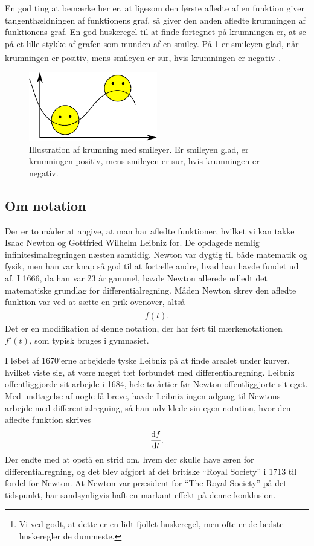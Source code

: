 En god ting at bemærke her er, at ligesom den første afledte af en funktion giver tangenthældningen af funktionens graf, så giver den anden afledte krumningen af funktionens graf.
En god huskeregel til at finde fortegnet på krumningen er, at se på et lille stykke af grafen som munden af en smiley. På \cref{mat:fig:krumning} er smileyen glad, når krumningen er positiv, mens smileyen er sur, hvis krumningen er negativ\footnote{Vi ved godt, at dette er en lidt fjollet huskeregel, men ofte er de bedste huskeregler de dummeste.}.
%
\begin{figure}[]
    \centering
    \includegraphics[width = 0.5\textwidth]{matfig/smiley.pdf}
    \caption{Illustration af krumning med smileyer. Er smileyen glad, er krumningen positiv, mens smileyen er sur, hvis krumningen er negativ.}
    \label{mat:fig:krumning}
\end{figure}

\subsection{Om notation}
Der er to måder at angive, at man har afledte funktioner, hvilket vi kan takke Isaac  Newton og Gottfried Wilhelm Leibniz for. De opdagede nemlig infinitesimalregningen næsten samtidig. Newton var dygtig til både matematik og fysik, men han var knap så god til at fortælle andre, hvad han havde fundet ud af.
%
I 1666, da han var 23 år gammel, havde Newton allerede udledt det matematiske grundlag for differentialregning. Måden Newton skrev den afledte funktion var ved at sætte en prik ovenover, altså
%
\begin{align*}
    \dot{f}(t).
\end{align*}
%
Det er en modifikation af denne notation, der har ført til mærkenotationen $f'(t)$, som typisk bruges i gymnasiet.

I løbet af 1670'erne arbejdede tyske Leibniz på at finde arealet under kurver, hvilket viste sig, at være meget tæt forbundet med differentialregning. Leibniz offentliggjorde sit arbejde i 1684, hele to årtier før Newton offentliggjorte sit eget. 
Med undtagelse af nogle få breve, havde Leibniz ingen adgang til Newtons arbejde med differentialregning, så han udviklede sin egen notation, hvor den afledte funktion skrives
%
\begin{align*}
    \dv{f}{t}.
\end{align*}
%
Der endte med at opstå en strid om, hvem der skulle have æren for differentialregning, og det blev afgjort af det britiske ``Royal Society'' i 1713 til fordel for Newton. At Newton var præsident for ``The Royal Society'' på det tidspunkt, har sandsynligvis haft en markant effekt på denne konklusion.

